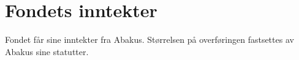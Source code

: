 \section{Fondets inntekter}
Fondet får sine inntekter fra Abakus. Størrelsen
på overføringen fastsettes av Abakus
sine statutter.
